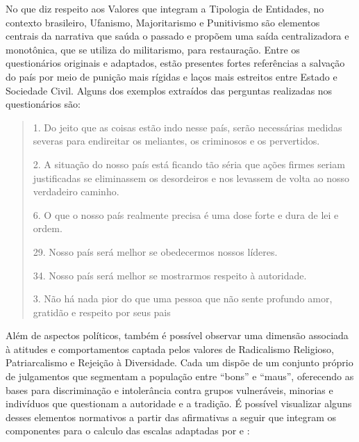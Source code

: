 \documentclass[
12pt,				%
openright,			%
twoside,			%
a4paper,			%
english,			%
french,				%
spanish,			%
brazil				%
]{abntex2}
\begin{document}
No que diz respeito aos Valores que integram a Tipologia de Entidades, no contexto brasileiro, Ufanismo, Majoritarismo e Punitivismo são elementos centrais da narrativa que saúda o passado e propõem uma saída centralizadora e monotônica, que se utiliza do militarismo, para restauração. Entre os questionários originais e adaptados, estão presentes fortes referências a salvação do país por meio de punição mais rígidas e laços mais estreitos entre Estado e Sociedade Civil. Alguns dos exemplos extraídos das perguntas realizadas nos questionários são:

\begin{quote}
	1. Do jeito que as coisas estão indo nesse país, serão necessárias medidas severas para endireitar os meliantes, os criminosos e os pervertidos.
	
	2. A situação do nosso país está ficando tão séria que ações firmes seriam justificadas se eliminassem os desordeiros e nos levassem de volta ao nosso verdadeiro caminho.
	
	6. O que o nosso país realmente precisa é uma dose forte e dura de lei e ordem.
	
	29. Nosso país será melhor se obedecermos nossos líderes.
	
	34. Nosso país será melhor se mostrarmos respeito à autoridade.
	
	3. Não há nada pior do que uma pessoa que não sente profundo amor, gratidão e respeito por seus pais
	
	\cite{vilanova2018adaptaccao, de2018analises}
	
\end{quote}  

Além de aspectos políticos, também é possível observar uma dimensão associada à atitudes e comportamentos captada pelos valores de Radicalismo Religioso, Patriarcalismo e Rejeição à Diversidade. Cada um dispõe de um conjunto próprio de julgamentos que segmentam a população entre ``bons'' e ``maus'', oferecendo as bases para discriminação e intolerância contra grupos vulneráveis, minorias e indivíduos que questionam a autoridade e a tradição. É possível visualizar alguns desses elementos normativos a partir das afirmativas a seguir que integram os componentes para o calculo das escalas adaptadas por  e :
 
\end{document}
